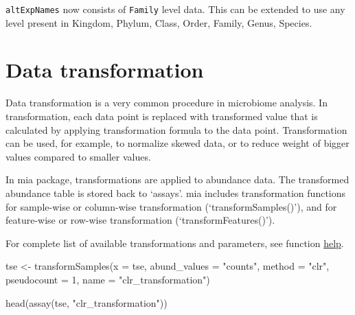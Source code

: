 \documentclass[
]{book}
\newenvironment{Shaded}{\begin{snugshade}}{\end{snugshade}}
\newcommand{\AttributeTok}[1]{\textcolor[rgb]{0.77,0.63,0.00}{#1}}
\newcommand{\DecValTok}[1]{\textcolor[rgb]{0.00,0.00,0.81}{#1}}
\newcommand{\FunctionTok}[1]{\textcolor[rgb]{0.00,0.00,0.00}{#1}}
\newcommand{\NormalTok}[1]{#1}
\newcommand{\OtherTok}[1]{\textcolor[rgb]{0.56,0.35,0.01}{#1}}
\newcommand{\StringTok}[1]{\textcolor[rgb]{0.31,0.60,0.02}{#1}}
\begin{document}
\texttt{altExpNames} now consists of \texttt{Family} level data. This can be extended to use
any level present in Kingdom, Phylum, Class, Order, Family, Genus, Species.

\hypertarget{data-transformation}{%
\section{Data transformation}\label{data-transformation}}

Data transformation is a very common procedure in microbiome analysis.
In transformation, each data point is replaced with transformed value that is
calculated by applying transformation formula to the data point. Transformation
can be used, for example, to normalize skewed data, or to reduce weight of bigger
values compared to smaller values.

In mia package, transformations are applied to abundance data. The transformed
abundance table is stored back to `assays'. mia includes transformation
functions for sample-wise or column-wise transformation (`transformSamples()'),
and for feature-wise or row-wise transformation (`transformFeatures()').

For complete list of available transformations and parameters, see function
\href{https://microbiome.github.io/mia/reference/transformCounts.html}{help}.

\begin{Shaded}
\begin{Highlighting}[]
\NormalTok{tse }\OtherTok{\textless{}{-}} \FunctionTok{transformSamples}\NormalTok{(}\AttributeTok{x =}\NormalTok{ tse, }\AttributeTok{abund\_values =} \StringTok{"counts"}\NormalTok{, }\AttributeTok{method =} \StringTok{"clr"}\NormalTok{, }
                        \AttributeTok{pseudocount =} \DecValTok{1}\NormalTok{, }\AttributeTok{name =} \StringTok{"clr\_transformation"}\NormalTok{)}

\FunctionTok{head}\NormalTok{(}\FunctionTok{assay}\NormalTok{(tse, }\StringTok{"clr\_transformation"}\NormalTok{))}
\end{Highlighting}
\end{Shaded}
\end{document}
